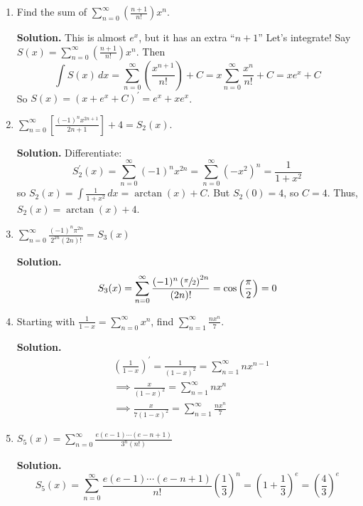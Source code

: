 \begin{Example}{}{}
    \begin{enumerate}
        \item Find the sum of $ \displaystyle \sum\limits_{n=0}^{\infty} \left( \frac{n+1}{n!} \right)x^n $.

              \textbf{Solution.} This is almost $ e^x $, but it has an extra ``$ n+1 $'' Let's integrate!
              Say $ S(x)=\sum\limits_{n=0}^{\infty} \left( \frac{n+1}{n!}  \right)x^n $. Then
              \[ \int S(x)\, d{x} =
                  \sum\limits_{n=0}^{\infty} \left( \frac{x^{n+1}}{n!}  \right) +C
                  =x \sum\limits_{n=0}^{\infty} \frac{x^n}{n!} +C
                  =x e^x+C \]
              So $ S(x)=(x+e^x+C)^\prime=e^x+xe^x $.

        \item $ \displaystyle \sum\limits_{n=0}^{\infty} \left[ \frac{(-1)^n x^{2n+1}}{2n+1} \right]+4
                  =S_2(x) $.

              \textbf{Solution.} Differentiate:
              \[ S_2^\prime(x)=\sum\limits_{n=0}^{\infty} (-1)^n x^{2n}=\sum\limits_{n=0}^{\infty} (-x^2)^n=
                  \frac{1}{1+x^2} \]
              so $ \displaystyle S_2(x)=\int \frac{1}{1+x^2} \, d{x} =\arctan(x)+C $. But $ S_2(0)=4 $,
              so $ C=4 $. Thus, $ S_2(x)=\arctan(x)+ 4 $.

        \item $ \displaystyle \sum\limits_{n=0}^{\infty} \frac{(-1)^n\pi^{2n}}{2^{2n}(2n)!}=S_3(x) $

              \textbf{Solution.}
              \[ S_3(x)=\sum\limits_{n=0}^{\infty} \frac{(-1)^n\left( \sfrac{\pi}{2} \right)^{2n}}{(2n)!}
                  =\cos\left( \frac{\pi}{2} \right)=0  \]

        \item Starting with $ \displaystyle \frac{1}{1-x} =\sum\limits_{n=0}^{\infty} x^n $,
              find $ \displaystyle\sum\limits_{n=1}^{\infty} \frac{n x^n}{7} $.

              \textbf{Solution.}
              \begin{align*}
                   & \left( \frac{1}{1-x} \right)^\prime=\frac{1}{(1-x)^2}=
                  \sum\limits_{n=1}^{\infty} n x^{n-1}                                      \\
                   & \implies \frac{x}{(1-x)^2}=\sum\limits_{n=1}^{\infty} n x^n            \\
                   & \implies \frac{x}{7(1-x)^2} =\sum\limits_{n=1}^{\infty} \frac{nx^n}{7}
              \end{align*}
        \item $ \displaystyle S_5(x)=\sum\limits_{n=0}^{\infty}
                  \frac{e(e-1)\cdots(e-n+1)}{3^n (n!)}  $

              \textbf{Solution.}
              \[ S_5(x)=\sum\limits_{n=0}^{\infty}
                  \frac{e(e-1)\cdots(e-n+1)}{n!}\left( \frac{1}{3}  \right)^n
                  =\left( 1+\frac{1}{3}  \right)^e
                  =\left( \frac{4}{3}  \right)^e \]

    \end{enumerate}
\end{Example}

